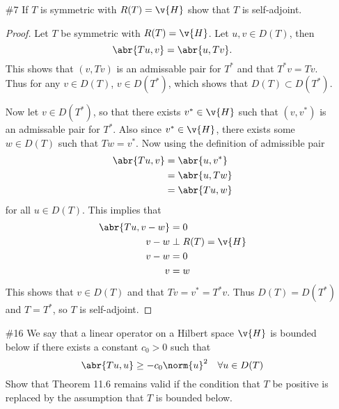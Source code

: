 \documentclass[11pt, oneside]{article}
\begin{document}
\begin{enumerate}
  \pagebreak
  \item[\#7] %
    If $T$ is symmetric with $R(T) = \v{H}$ show that $T$ is self-adjoint.

    \begin{proof}
      Let $T$ be symmetric with $R(T) = \v{H}$.
      Let $u, v \in D(T)$, then
      \[
        \abr{Tu, v} = \abr{u, Tv}.
      \]
      This shows that $(v, Tv)$ is an admissable pair for $T^*$ and that
      $T^* v = Tv$.
      Thus for any $v \in D(T)$, $v \in D(T^*)$, which shows that
      $D(T) \subset D(T^*)$.

      Now let $v \in D(T^*)$, so that there exists $v^* \in \v{H}$ such that
      $(v, v^*)$ is an admissable pair for $T^*$.
      Also since $v^* \in \v{H}$, there exists some $w \in D(T)$ such that
      $Tw = v^*$.
      Now using the definition of admissible pair
      \begin{align*}
        \abr{Tu, v} &= \abr{u, v^*} \\
        &= \abr{u, Tw} \\
        &= \abr{Tu, w}
      \end{align*}
      for all $u \in D(T)$.
      This implies that
      \begin{align*}
        \abr{Tu, v - w} &= 0 \\
        v - w &\perp R(T) = \v{H}\\
        v - w &= 0 \\
        v &= w
      \end{align*}
      This shows that $v \in D(T)$ and that $Tv = v^* = T^* v$.
      Thus $D(T) = D(T^*)$ and $T = T^*$, so $T$ is self-adjoint.
    \end{proof}

  \pagebreak
  \item[\#16] %
    We say that a linear operator on a Hilbert space $\v{H}$ is bounded below
    if there exists a constant $c_0 > 0$ such that
    \[
      \abr{Tu, u} \ge -c_0 \norm{u}^2 \quad \forall u \in D(T)
    \]
    Show that Theorem 11.6 remains valid if the condition that $T$ be positive
    is replaced by the assumption that $T$ is bounded below.


\end{enumerate}
\end{document}
